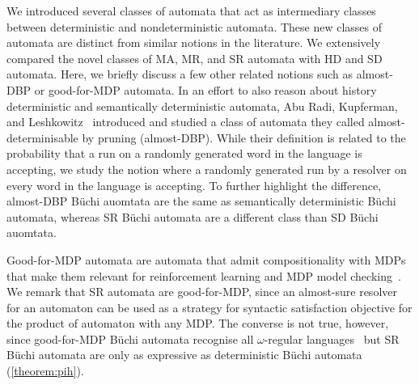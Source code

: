 We introduced several classes of automata that act as intermediary classes between deterministic and nondeterministic automata. These new classes of automata are distinct from similar notions in the literature. We extensively compared the novel classes of MA, MR, and SR automata with HD and SD automata. Here, we briefly discuss a few other related notions such as almost-DBP or good-for-MDP automata.  
In an effort to also reason about history deterministic and semantically deterministic automata, Abu Radi, Kupferman, and Leshkowitz~\cite{AKL21} introduced and studied a class of automata they called almost-determinisable by pruning (almost-DBP). 
While their definition is related to the probability that a run on a randomly generated word in the language is accepting, we study the notion where a randomly generated run by a resolver on every word in the language is accepting.  
To further highlight the difference, almost-DBP B\"uchi auomtata are the same as semantically deterministic B\"uchi automata, whereas SR B\"uchi automata are a different class than SD B\"uchi auomtata.  

Good-for-MDP automata are automata that admit compositionality with MDPs that make them relevant for reinforcement learning and MDP model checking~\cite{HPSS0W20}. We remark that SR automata are good-for-MDP, since an almost-sure resolver for an automaton can be used as a strategy for syntactic satisfaction objective for the product of automaton with any MDP. The converse is not true, however, since good-for-MDP B\"uchi automata recognise all $\omega$-regular languages~\cite[Section 3.2]{HPSS0W20} but SR B\"uchi automata are only as expressive as deterministic B\"uchi automata (\cref{theorem:pih}).

